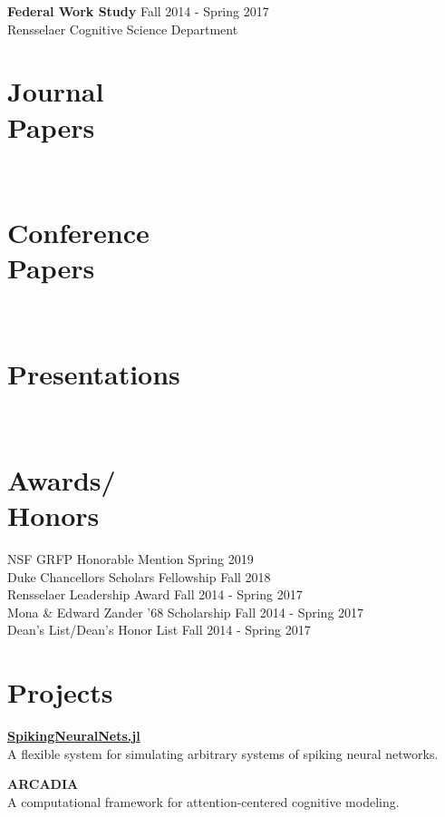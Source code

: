 \documentclass[margin]{res}
\begin{document}
\begin{resume}
  \textbf{Federal Work Study} \hfill Fall 2014 - Spring 2017 \\
  Rensselaer Cognitive Science Department \\


  
  \section{Journal\\Papers}
   \\
  
  \section{Conference\\Papers}
   \\
  
  \section{Presentations}
   \\

  \section{Awards/\\Honors}
  NSF GRFP Honorable Mention \hfill Spring 2019 \\
  Duke Chancellors Scholars Fellowship \hfill Fall 2018 \\
  Rensselaer Leadership Award \hfill Fall 2014 - Spring 2017 \\
  Mona \& Edward Zander '68 Scholarship \hfill Fall 2014 - Spring 2017 \\
  Dean's List/Dean's Honor List \hfill Fall 2014 - Spring 2017 \\
  
  \section{Projects}
  \href{https://github.com/pearsonlab/SpikingNeuralNets.jl}{\textbf{SpikingNeuralNets.jl}} \\
  A flexible system for simulating arbitrary systems of spiking neural networks.

  \textbf{ARCADIA} \\
  A computational framework for attention-centered cognitive modeling.
  

\end{resume}
\end{document}
